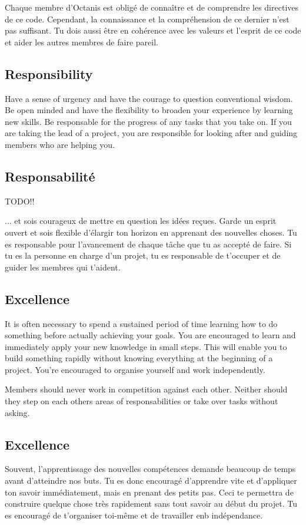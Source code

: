 	Chaque membre d'Octanis est obligé de connaître et de comprendre les directives de ce code.
	Cependant, la connaissance et la compréhension de ce dernier n'est pas suffisant. Tu dois aussi être en cohérence avec les valeurs et l'esprit de ce code et aider les autres membres de faire pareil.



	
\english
	\subsection{Responsibility}
	Have a sense of urgency and have the courage to question conventional wisdom. Be open minded and have the flexibility to broaden your experience by learning new skills. Be responsable for the progress of any tasks that you take on. If you are taking the lead of a project, you are responsible for looking after and guiding members who are helping you.



\french
	\subsection{Responsabilité}

	TODO!!

	... et sois courageux de mettre en question les idées reçues. Garde un esprit ouvert et sois flexible d'élargir ton horizon en apprenant des nouvelles choses. Tu es responsable pour l'avancement de chaque tâche que tu as accepté de faire. Si tu es la personne en charge d'un projet, tu es responsable de t'occuper et de guider les membres qui t'aident. 

\english
	\subsection{Excellence}
 	It is often necessary to spend a sustained period of time learning how to do something before actually achieving your goals. You are encouraged to learn and immediately apply your new knowledge in small steps. This will enable you to build something rapidly without knowing everything at the beginning of a project. You're encouraged to organise yourself and work independently. 
 	

	Members should never work in competition against each other. Neither should they step on each others areas of responsabilities or take over tasks without asking.




\french
	\subsection{Excellence}
	Souvent, l'apprentissage des nouvelles compétences demande beaucoup de temps avant d'atteindre nos buts. Tu es donc encouragé d'apprendre vite et d'appliquer ton savoir immédiatement, mais en prenant des petits pas. Ceci te permettra de construire quelque chose très rapidement sans tout savoir au début du projet. Tu es encouragé de t'organiser toi-même et de travailler enb indépendance. 


